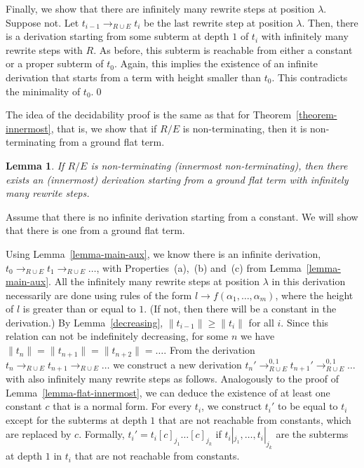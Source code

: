 \documentclass{LMCS}
\theoremstyle{plain}
\newtheorem{lemma}[thm]{Lemma}
\begin{document}
Finally, we show that 
there are infinitely many rewrite steps at position $\lambda$.
Suppose not. Let $t_{i-1}\rightarrow_{R\cup E} t_i$
be the last rewrite step at position $\lambda$. Then, 
there is a derivation starting from
some subterm at depth $1$ of $t_i$ with infinitely many
rewrite steps with $R$.
As before, this subterm is reachable
from either a constant or a proper subterm of $t_0$.
Again, this implies the existence of an infinite derivation
that starts from a term with height smaller than $t_0$.
This contradicts the minimality of $t_0$.\qed


The idea of the decidability proof is the same as that
for Theorem~\ref{theorem-innermost}, that is, we show
that if $R/E$ is non-terminating, then it is non-terminating
from a ground flat term.

\begin{lemma}\label{lemma-main}
If $R/E$ is non-terminating (innermost non-terminating), then
there exists an (innermost) derivation starting from
a ground flat term with infinitely many rewrite steps.
\end{lemma}
\proof
Assume that
there is no infinite derivation starting from a constant.
We will show that there is one from a ground flat term.





Using Lemma~\ref{lemma-main-aux}, we know there is
an infinite derivation,
$t_0\rightarrow_{R\cup E} t_1 \rightarrow_{R\cup E}\ldots$,
with Properties~(a),~(b) and~(c) from Lemma~\ref{lemma-main-aux}.
All the infinitely many rewrite steps at position $\lambda$
in this derivation necessarily are done using rules of the form 
$l\rightarrow f(\alpha_1,\ldots,\alpha_m)$,
where the height of $l$ is greater than or equal to $1$.
(If not, then there will be a constant in the derivation.)
By Lemma~\ref{decreasing}, $\|t_{i-1}\|\geq\|t_i\|$ for all $i$.
Since this relation can not be indefinitely decreasing,
for some $n$ we have $\|t_n\|=\|t_{n+1}\|=\|t_{n+2}\|=\ldots$.
From the derivation $t_n\rightarrow_{R\cup E} t_{n+1}
\rightarrow_{R\cup E}\ldots$
we construct a new derivation
$t_n'\rightarrow_{R\cup E}^{0,1} t_{n+1}'\rightarrow_{R\cup E}^{0,1}
\ldots$ with also infinitely many rewrite steps as follows.
Analogously to the
proof of Lemma~\ref{lemma-flat-innermost}, 
we can deduce the existence of 
at least one constant $c$ that is a normal form.
For every $t_i$, we construct $t_i'$ to be equal to $t_i$
except for the subterms at depth $1$ that are not reachable
from constants, which are replaced by $c$. Formally,
$t_i'=t_i[c]_{j_1}\ldots [c]_{j_k}$ if $t_i|_{j_1},\ldots, t_i|_{j_k}$
are the subterms at depth $1$ in $t_i$ that are not reachable
from constants.
\end{document}
